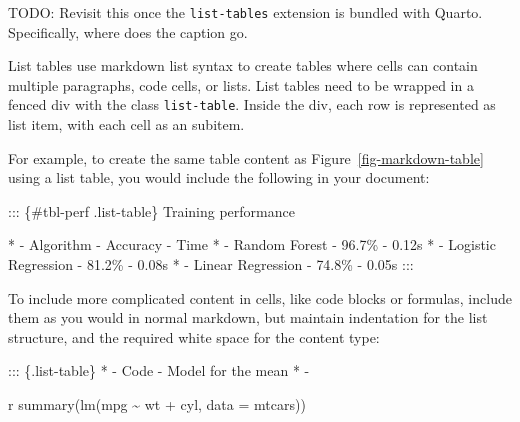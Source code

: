 \documentclass[
  letterpaper,
  DIV=11,
  numbers=noendperiod,
  oneside]{scrreprt}
\newenvironment{Shaded}{\begin{snugshade}}{\end{snugshade}}
\newcommand{\AttributeTok}[1]{\textcolor[rgb]{0.40,0.45,0.13}{#1}}
\newcommand{\FunctionTok}[1]{\textcolor[rgb]{0.28,0.35,0.67}{#1}}
\newcommand{\InformationTok}[1]{\textcolor[rgb]{0.37,0.37,0.37}{#1}}
\newcommand{\NormalTok}[1]{\textcolor[rgb]{0.00,0.23,0.31}{#1}}
\newcommand{\SpecialCharTok}[1]{\textcolor[rgb]{0.37,0.37,0.37}{#1}}
\newcommand{\SpecialStringTok}[1]{\textcolor[rgb]{0.13,0.47,0.30}{#1}}
\begin{document}
\begin{tcolorbox}
TODO: Revisit this once the \texttt{list-tables} extension is bundled
with Quarto. Specifically, where does the caption go.

List tables use markdown list syntax to create tables where cells can
contain multiple paragraphs, code cells, or lists. List tables need to
be wrapped in a fenced div with the class \texttt{list-table}. Inside
the div, each row is represented as list item, with each cell as an
subitem.

For example, to create the same table content as
Figure~\ref{fig-markdown-table} using a list table, you would include
the following in your document:

\begin{Shaded}
\begin{Highlighting}[]
\NormalTok{::: \{\#tbl{-}perf .list{-}table\}}
\NormalTok{Training performance }

\SpecialStringTok{* }\NormalTok{{-} Algorithm}
\SpecialStringTok{  {-} }\NormalTok{Accuracy}
\SpecialStringTok{  {-} }\NormalTok{Time}
\SpecialStringTok{* }\NormalTok{{-} Random Forest}
\SpecialStringTok{  {-} }\NormalTok{96.7\%}
\SpecialStringTok{  {-} }\NormalTok{0.12s}
\SpecialStringTok{* }\NormalTok{{-} Logistic Regression}
\SpecialStringTok{  {-} }\NormalTok{81.2\%}
\SpecialStringTok{  {-} }\NormalTok{0.08s}
\SpecialStringTok{* }\NormalTok{{-} Linear Regression}
\SpecialStringTok{  {-} }\NormalTok{74.8\%}
\SpecialStringTok{  {-} }\NormalTok{0.05s}
\NormalTok{:::}
\end{Highlighting}
\end{Shaded}

To include more complicated content in cells, like code blocks or
formulas, include them as you would in normal markdown, but maintain
indentation for the list structure, and the required white space for the
content type:

\begin{Shaded}
\begin{Highlighting}[]
\NormalTok{::: \{.list{-}table\}}
\SpecialStringTok{* }\NormalTok{{-} Code}
\SpecialStringTok{  {-} }\NormalTok{Model for the mean}
\SpecialStringTok{* }\NormalTok{{-} }
    
    \InformationTok{\textasciigrave{}\textasciigrave{}\textasciigrave{}r}
    \FunctionTok{summary}\NormalTok{(}\FunctionTok{lm}\NormalTok{(mpg }\SpecialCharTok{\textasciitilde{}}\NormalTok{ wt }\SpecialCharTok{+}\NormalTok{ cyl, }\AttributeTok{data =}\NormalTok{ mtcars))}
    \InformationTok{\textasciigrave{}\textasciigrave{}\textasciigrave{}}


\end{Highlighting}
\end{Shaded}
\end{tcolorbox}
\end{document}
